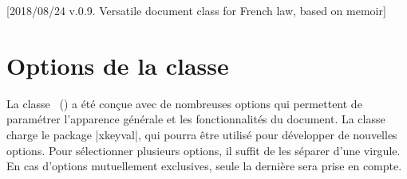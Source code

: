 %
% 
%
% 
%


\begin{noprint}
%
	[2018/08/24 v.0.9. Versatile document class for French law, based on memoir]
\end{noprint}




\chapter{Options de la classe \frenchlaw}

La classe \frenchlaw~() a été conçue avec de nombreuses options qui permettent de paramétrer l'apparence générale et les fonctionnalités du document. La classe charge le package |xkeyval|, qui pourra être utilisé pour développer de nouvelles options. Pour sélectionner plusieurs options, il suffit de les séparer d'une virgule. En cas d'options mutuellement exclusives, seule la dernière sera prise en compte.

\begin{noprint}
\RequirePackage{xkeyval}
\end{noprint}


